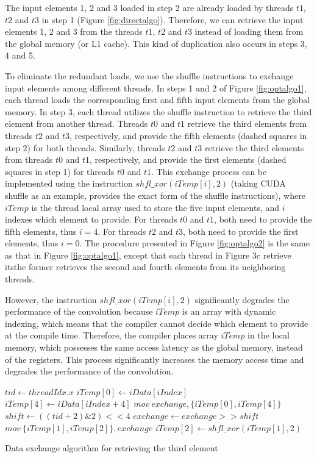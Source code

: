 The input elements 1, 2 and 3 loaded in step 2 are already loaded by threads $t1$, $t2$ and $t3$ in
step 1 (Figure \ref{fig:directalgo}). Therefore, we can retrieve the input elements 1, 2 and 3 from the threads $t1$, $t2$ and $t3$ instead of loading them from the global memory (or L1
cache). This kind of duplication also occurs in steps 3, 4 and 5.

To eliminate the redundant loads, we use the shuffle instructions to exchange input elements among different threads. In steps 1
and 2 of Figure \ref{fig:optalgo1}, each thread loads the corresponding first and fifth input elements from the global memory. In step 3, each
thread utilizes the shuffle instruction to retrieve the third element from another thread. Threads $t0$ and $t1$ retrieve the third elements
from threads $t2$ and $t3$, respectively, and provide the fifth elements (dashed squares in step 2) for both threads.
Similarly, threads $t2$ and $t3$ retrieve the third elements from threads $t0$ and $t1$, respectively, and provide the first
elements (dashed squares in step 1) for threads $t0$ and $t1$. This exchange process can be implemented using the instruction
$shfl\_xor(iTemp[i],2)$ (taking CUDA shuffle as an example, \cite{CUDAtoolkit} provides the exact form of the shuffle instructions), where $iTemp$ is the thread local
array used to store the five input elements, and $i$ indexes which element to provide. For threads $t0$ and $t1$, both need to provide the fifth
elements, thus $i=4$. For threads $t2$ and $t3$, both need to provide the first elements, thus $i=0$. The procedure presented in Figure  \ref{fig:optalgo2} is the same as that in Figure \ref{fig:optalgo1}, except that each thread in Figure 3c retrieve itsthe former retrieves the second and fourth elements from its neighboring threads.

However, the instruction $shfl\_xor(iTemp[i],2)$ significantly degrades the performance of the convolution because $iTemp$ is an array with
dynamic indexing, which means that the compiler cannot decide which element to provide at the compile time. Therefore, the compiler 
places array $iTemp$ in the local memory, which possesses the same access latency as the global memory, instead of the registers. This process significantly increases the memory access time and degrades the performance of the convolution.

\begin{algorithm}
	$tid \gets threadIdx.x$\;
	$iTemp[0] \gets iData[iIndex]$\;
	$iTemp[4] \gets iData[iIndex+4]$\;
	$mov\ exchange, \{iTemp[0], iTemp[4]\}$\;
	$shift \gets ((tid+2)\&2)<<4$\;
	$exchange \gets exchange >> shift$\;
	$mov\ \{iTemp[1],iTemp[2]\}, exchange$\;
	$iTemp[2] \gets shfl\_xor(iTemp[1],2)$\;	
	
	\caption{Data exchange algorithm for retrieving the third element}
	\label{algo:basic}
\end{algorithm}

